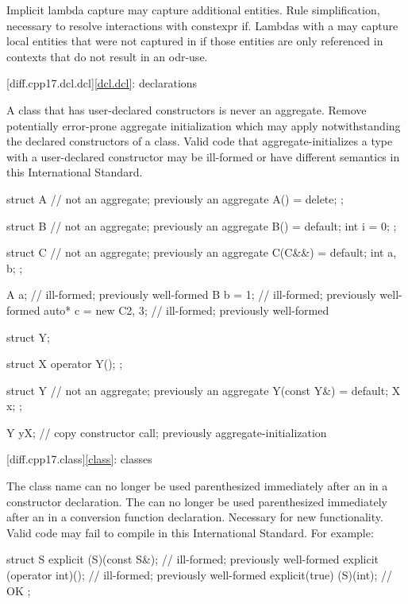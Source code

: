 \change Implicit lambda capture may capture additional entities.
\rationale Rule simplification, necessary to resolve interactions with constexpr if.
\effect Lambdas with a 
may capture local entities
that were not captured in \CppXVII{}
if those entities are only referenced in contexts
that do not result in an odr-use.

[diff.cpp17.dcl.dcl]{\ref{dcl.dcl}: declarations}

\change A class that has user-declared constructors is never an aggregate.
\rationale Remove potentially error-prone aggregate initialization
which may apply notwithstanding the declared constructors of a class.
\effect Valid \CppXVII{} code that aggregate-initializes
a type with a user-declared constructor
may be ill-formed or have different semantics
in this International Standard.
\begin{codeblock}
struct A {              // not an aggregate; previously an aggregate
  A() = delete;
};

struct B {              // not an aggregate; previously an aggregate
  B() = default;
  int i = 0;
};

struct C {              // not an aggregate; previously an aggregate
  C(C&&) = default;
  int a, b;
};

A a{};                  // ill-formed; previously well-formed
B b = {1};              // ill-formed; previously well-formed
auto* c = new C{2, 3};  // ill-formed; previously well-formed

struct Y;

struct X {
  operator Y();
};

struct Y {              // not an aggregate; previously an aggregate
  Y(const Y&) = default;
  X x;
};

Y y{X{}};               // copy constructor call; previously aggregate-initialization
\end{codeblock}

[diff.cpp17.class]{\ref{class}: classes}

\change
The class name can no longer be used parenthesized
immediately after an  
in a constructor declaration.
The  can no longer be used parenthesized
immediately after an  
in a conversion function declaration.
\rationale
Necessary for new functionality.
\effect
Valid \CppXVII{} code may fail to compile
in this International Standard. For example:
\begin{codeblock}
struct S {
  explicit (S)(const S&);       // ill-formed; previously well-formed
  explicit (operator int)();    // ill-formed; previously well-formed
  explicit(true) (S)(int);      // OK
};
\end{codeblock}


